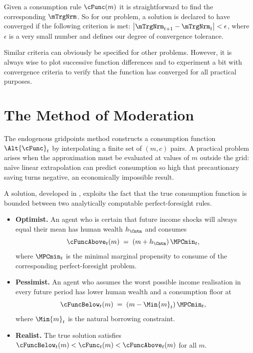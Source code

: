\documentclass[titlepage, headings=optiontotocandhead]{econark}
\begin{document}
{Given a consumption rule $\cFunc(m)$ it is straightforward to find
the corresponding $\mTrgNrm$.  So for our problem, a solution is declared
to have converged if the following criterion is met:
$\left|\mTrgNrm_{t+1}-\mTrgNrm_{t}\right| < \epsilon$, where $\epsilon$ is
a very small number and defines our degree of convergence tolerance.

Similar criteria can obviously be specified for other problems.
However, it is always wise to plot successive function differences and
to experiment a bit with convergence criteria to verify that the
function has converged for all practical purposes.



}
\hypertarget{method-of-moderation}{}
\section{The Method of Moderation}\label{sec:method-of-moderation}

The endogenous gridpoints method constructs a consumption function
$\Alt{\cFunc}_{t}$ by interpolating a finite set of
$(m,c)$ pairs.  A practical problem arises when the
approximation must be evaluated at values of $m$ outside the
grid: na\"ive linear extrapolation can predict consumption so high
that precautionary saving turns negative, an economically impossible
result.

A solution, developed in \cite{method-of-moderation}, exploits the fact that the
true consumption function is bounded between two analytically
computable perfect-foresight rules.
\begin{itemize}
  \item \textbf{Optimist.} An agent who is certain that future income
  shocks will always equal their mean has human wealth
  $h_{\Cntn}$ and consumes
  \begin{equation}
    \cFuncAbove_{t}(m) \;=\;
      (m + h_{\Cntn})\,\MPCmin_{t},
      \label{eq:cFuncAboveBrief}
  \end{equation}
  where $\MPCmin_{t}$ is the minimal marginal propensity to
  consume of the corresponding perfect-foresight problem.
  \item \textbf{Pessimist.} An agent who assumes the worst possible
  income realisation in every future period has lower human wealth and
  a consumption floor at
  \begin{equation}
    \cFuncBelow_{t}(m) \;=\;
      (m - \Min{m}_{t})\,\MPCmin_{t},
      \label{eq:cFuncBelowBrief}
  \end{equation}
  where $\Min{m}_{t}$ is the natural borrowing constraint.
  \item \textbf{Realist.}  The true solution satisfies
  $\cFuncBelow_{t}(m) < \cFunc_{t}(m) <
  \cFuncAbove_{t}(m)$ for all $m$.
\end{itemize}
\end{document}
